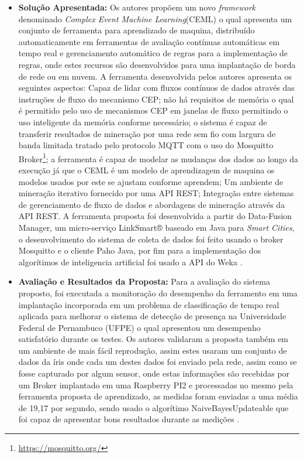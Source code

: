 \documentclass[tid,table]{texufpel} %
\begin{document}
\begin{itemize}
	\item \textbf{Solução Apresentada:} Os autores propõem um novo \textit{framework} denominado \textit{Complex Event Machine Learning}(CEML) o qual apresenta um conjunto de ferramenta para aprendizado de maquina, distribuído automaticamente em ferramentas de avaliação contínuas automáticas em tempo real e gerenciamento automático de regras para a implementação de regras, onde estes recursos são desenvolvidos para uma implantação de borda de rede ou em nuvem. A ferramenta desenvolvida pelos autores apresenta os seguintes aspectos: Capaz de lidar com fluxos contínuos de dados através das instruções de fluxo do mecanismo CEP; não há requisitos de memória o qual é permitido pelo uso de mecanismos CEP em janelas de fluxo permitindo o uso inteligente da memória conforme necessário; o sistema é capaz de transferir resultados de mineração por uma rede sem fio com largura de banda limitada tratado pelo protocolo MQTT com o uso do Mosquitto Broker\footnote{\url{https://mosquitto.org/}}; a ferramenta é capaz de modelar as mudanças dos dados ao longo da execução já que o CEML é um modelo de aprendizagem de maquina os modelos usados por este se ajustam conforme aprendem; Um ambiente de mineração iterativo fornecido por uma API REST; Integração entre sistemas de gerenciamento de fluxo de dados e abordagens de mineração através da API REST. A ferramenta proposta foi desenvolvida a partir do Data-Fusion Manager, um micro-serviço LinkSmart® baseado em Java para \textit{Smart Cities}, o desenvolvimento do sistema de coleta de dados foi feito usando o broker Mosquitto e o cliente Paho Java, por fim para a implementação dos algorítimos de inteligencia artificial foi usado a API do Weka \cite{art10soto2016ceml}. 
	
	\item \textbf{Avaliação e Resultados da Proposta:} Para a avaliação do sistema proposto, foi executada a monitoração do desempenho da ferramento em uma implantação incorporada em um problema de classificação de tempo real aplicada para melhorar o sistema de detecção de presença na Universidade Federal de Pernambuco (UFPE) o qual apresentou um desempenho satisfatório durante os testes. Os autores validaram a proposta também em um ambiente de mais fácil reprodução, assim estes usaram um conjunto de dados da íris onde cada um destes dados foi enviado pela rede, assim como se fosse capturado por algum sensor,  onde estas informações são recebidas por um Broker implantado em uma Raspberry PI2 e processadas no mesmo pela ferramenta proposta de aprendizado, as medidas foram enviadas a uma média de 19,17 por segundo, sendo usado o algorítimo NaiveBayesUpdateable que foi capaz de apresentar bons resultados durante as medições \cite{art10soto2016ceml}.
	
	
	
\end{itemize}
\end{document}
